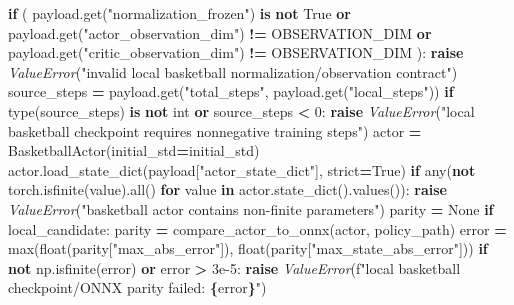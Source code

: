 \documentclass[
  chinese,
  11pt,
  letterpaper,
]{article}
\newenvironment{Shaded}{\begin{snugshade}}{\end{snugshade}}
\newcommand{\BuiltInTok}[1]{#1}
\newcommand{\ControlFlowTok}[1]{\textcolor[rgb]{0.13,0.29,0.53}{\textbf{#1}}}
\newcommand{\DecValTok}[1]{\textcolor[rgb]{0.00,0.00,0.81}{#1}}
\newcommand{\FloatTok}[1]{\textcolor[rgb]{0.00,0.00,0.81}{#1}}
\newcommand{\KeywordTok}[1]{\textcolor[rgb]{0.13,0.29,0.53}{\textbf{#1}}}
\newcommand{\NormalTok}[1]{#1}
\newcommand{\OperatorTok}[1]{\textcolor[rgb]{0.81,0.36,0.00}{\textbf{#1}}}
\newcommand{\PreprocessorTok}[1]{\textcolor[rgb]{0.56,0.35,0.01}{\textit{#1}}}
\newcommand{\SpecialCharTok}[1]{\textcolor[rgb]{0.81,0.36,0.00}{\textbf{#1}}}
\newcommand{\SpecialStringTok}[1]{\textcolor[rgb]{0.31,0.60,0.02}{#1}}
\newcommand{\StringTok}[1]{\textcolor[rgb]{0.31,0.60,0.02}{#1}}
\newcommand{\VariableTok}[1]{\textcolor[rgb]{0.00,0.00,0.00}{#1}}
\renewenvironment{Shaded}{\par\smallskip}{\par\smallskip}
\begin{document}
\begin{Shaded}
\begin{Highlighting}[]
        \ControlFlowTok{if}\NormalTok{ (}
\NormalTok{            payload.get(}\StringTok{"normalization\_frozen"}\NormalTok{) }\KeywordTok{is} \KeywordTok{not} \VariableTok{True}
            \KeywordTok{or}\NormalTok{ payload.get(}\StringTok{"actor\_observation\_dim"}\NormalTok{) }\OperatorTok{!=}\NormalTok{ OBSERVATION\_DIM}
            \KeywordTok{or}\NormalTok{ payload.get(}\StringTok{"critic\_observation\_dim"}\NormalTok{) }\OperatorTok{!=}\NormalTok{ OBSERVATION\_DIM}
\NormalTok{        ):}
            \ControlFlowTok{raise} \PreprocessorTok{ValueError}\NormalTok{(}\StringTok{"invalid local basketball normalization/observation contract"}\NormalTok{)}
\NormalTok{        source\_steps }\OperatorTok{=}\NormalTok{ payload.get(}\StringTok{"total\_steps"}\NormalTok{, payload.get(}\StringTok{"local\_steps"}\NormalTok{))}
        \ControlFlowTok{if} \BuiltInTok{type}\NormalTok{(source\_steps) }\KeywordTok{is} \KeywordTok{not} \BuiltInTok{int} \KeywordTok{or}\NormalTok{ source\_steps }\OperatorTok{\textless{}} \DecValTok{0}\NormalTok{:}
            \ControlFlowTok{raise} \PreprocessorTok{ValueError}\NormalTok{(}\StringTok{"local basketball checkpoint requires nonnegative training steps"}\NormalTok{)}
\NormalTok{    actor }\OperatorTok{=}\NormalTok{ BasketballActor(initial\_std}\OperatorTok{=}\NormalTok{initial\_std)}
\NormalTok{    actor.load\_state\_dict(payload[}\StringTok{"actor\_state\_dict"}\NormalTok{], strict}\OperatorTok{=}\VariableTok{True}\NormalTok{)}
    \ControlFlowTok{if} \BuiltInTok{any}\NormalTok{(}\KeywordTok{not}\NormalTok{ torch.isfinite(value).}\BuiltInTok{all}\NormalTok{() }\ControlFlowTok{for}\NormalTok{ value }\KeywordTok{in}\NormalTok{ actor.state\_dict().values()):}
        \ControlFlowTok{raise} \PreprocessorTok{ValueError}\NormalTok{(}\StringTok{"basketball actor contains non{-}finite parameters"}\NormalTok{)}
\NormalTok{    parity }\OperatorTok{=} \VariableTok{None}
    \ControlFlowTok{if}\NormalTok{ local\_candidate:}
\NormalTok{        parity }\OperatorTok{=}\NormalTok{ compare\_actor\_to\_onnx(actor, policy\_path)}
\NormalTok{        error }\OperatorTok{=} \BuiltInTok{max}\NormalTok{(}\BuiltInTok{float}\NormalTok{(parity[}\StringTok{"max\_abs\_error"}\NormalTok{]), }\BuiltInTok{float}\NormalTok{(parity[}\StringTok{"max\_state\_abs\_error"}\NormalTok{]))}
        \ControlFlowTok{if} \KeywordTok{not}\NormalTok{ np.isfinite(error) }\KeywordTok{or}\NormalTok{ error }\OperatorTok{\textgreater{}} \FloatTok{3e{-}5}\NormalTok{:}
            \ControlFlowTok{raise} \PreprocessorTok{ValueError}\NormalTok{(}\SpecialStringTok{f"local basketball checkpoint/ONNX parity failed: }\SpecialCharTok{\{}\NormalTok{error}\SpecialCharTok{\}}\SpecialStringTok{"}\NormalTok{)}

\end{Highlighting}
\end{Shaded}
\end{document}
